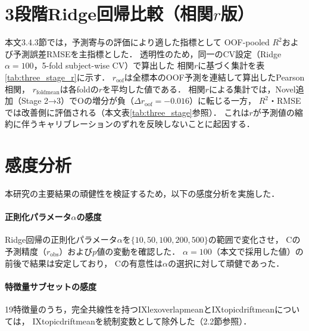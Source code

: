 \documentclass[dvipdfmx,11pt,a4paper]{bxjsarticle}
\renewcommand{\_}{\paperorigunderscore\allowbreak}%
\begin{document}
\section{3段階Ridge回帰比較（相関$r$版）}
\label{sec:appendix_three_stage_r}
本文3.4.3節では，予測寄与の評価により適した指標として
OOF-pooled $R^2$および予測誤差RMSEを主指標とした．
透明性のため，同一のCV設定（Ridge $\alpha=100$，5-fold subject-wise CV）で算出した
相関$r$に基づく集計を表\ref{tab:three_stage_r}に示す．
$r_{\text{oof}}$は全標本のOOF予測を連結して算出したPearson相関，
$r_{\text{foldmean}}$は各foldの$r$を平均した値である．
相関$r$による集計では，Novel追加（Stage 2→3）でOの増分が負（$\Delta r_{\text{oof}} = -0.016$）に転じる一方，
$R^2$・RMSEでは改善側に評価される（本文表\ref{tab:three_stage}参照）．
これは$r$が予測値の縮約に伴うキャリブレーションのずれを反映しないことに起因する．

\begin{table}[htbp]
\centering
\caption{3段階Ridge回帰比較（相関$r$版・参考）．
$r_{\text{oof}}$はOOF予測連結によるPearson相関，
$r_{\text{foldmean}}$は5-fold平均，$\Delta r_{\text{oof}}$は隣接ステージ間の増分．}
\label{tab:three_stage_r}

\end{table}

\section{感度分析}
\label{sec:appendix_sensitivity}

本研究の主要結果の頑健性を検証するため，以下の感度分析を実施した．

\paragraph{正則化パラメータ$\alpha$の感度}
Ridge回帰の正則化パラメータ$\alpha$を$\{10, 50, 100, 200, 500\}$の範囲で変化させ，
Cの予測精度（$r_{\text{obs}}$）および$p$値の変動を確認した．
$\alpha = 100$（本文で採用した値）の前後で結果は安定しており，
Cの有意性は$\alpha$の選択に対して頑健であった．

\paragraph{特徴量サブセットの感度}
19特徴量のうち，完全共線性を持つIX\_lex\_overlap\_meanとIX\_topic\_drift\_meanについては，
IX\_topic\_drift\_meanを統制変数として除外した（2.2節参照）．
\end{document}
